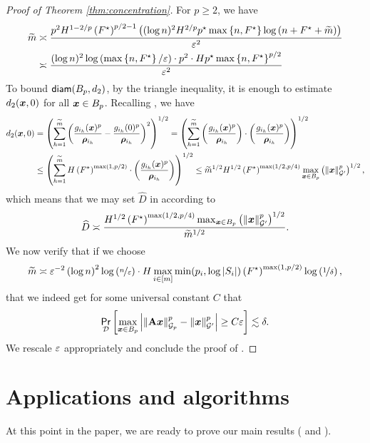\documentclass[11pt]{article}
\numberwithin{equation}{section}
\begin{document}
\begin{proof}[Proof of Theorem \ref{thm:concentration}]
For $p \ge 2$, we have
\begin{align*}
    \widetilde{m} &\asymp \frac{p^2H^{1-2/p}\left(F^{\star}\right)^{p/2-1}\left((\log n)^2H^{2/p}p^{\star}\max\left\{n,F^{\star}\right\}\log\left(n+F^{\star}+\widetilde{m}\right)\right)}{\varepsilon^2} \\
    &\asymp \frac{(\log n)^2\log\left(\max\left\{n,F^{\star}\right\}/\varepsilon\right)\cdot p^2 \cdot Hp^{\star}\max\left\{n,F^{\star}\right\}^{p/2}}{\varepsilon^2}
\end{align*}
To bound $\mathsf{diam}(B_p,d_2)$, by the triangle inequality, it is enough to estimate $d_2(\bm{x},0)$ for all $\bm{x} \in B_p$. Recalling , we have
\begin{align*}
    d_2(\bm{x},0) &= \left(\sum_{h=1}^{\widetilde{m}} \left(\frac{g_{i_h}(\bm{x})^p}{\bm{\rho}_{i_h}} - \frac{g_{i_h}(0)^p}{\bm{\rho}_{i_h}}\right)^2\right)^{1/2} = \left(\sum_{h=1}^{\widetilde{m}} \left(\frac{g_{i_h}(\bm{x})^p}{\bm{\rho}_{i_h}}\right)\cdot\left(\frac{g_{i_h}(\bm{x})^p}{\bm{\rho}_{i_h}}\right)\right)^{1/2} \\
    &\le \left(\sum_{h=1}^{\widetilde{m}} H\left(F^{\star}\right)^{\max(1,p/2)}\cdot\left(\frac{g_{i_h}(\bm{x})^p}{\bm{\rho}_{i_h}}\right)\right)^{1/2} \le \widetilde{m}^{1/2}H^{1/2}\left(F^{\star}\right)^{\max(1/2,p/4)}\max_{\bm{x}\in B_p}\left(\left\lVert \bm{x} \right\rVert_{\mathcal{G}'}^{p}\right)^{1/2},
\end{align*}
which means that we may set $\widehat{D}$ in  according to
\begin{align*}
    \widehat{D} \asymp \frac{H^{1/2}\left(F^{\star}\right)^{\max(1/2,p/4)}\max_{\bm{x}\in B_p}\left(\left\lVert \bm{x} \right\rVert_{\mathcal{G}'}^{p}\right)^{1/2}}{\widetilde{m}^{1/2}}.
\end{align*}
We now verify that if we choose
\begin{align*}
    \widetilde{m} \asymp \varepsilon^{-2}\left(\log n\right)^2\log\left(\nicefrac{n}{\varepsilon}\right) \cdot H\max_{i \in [m]} \min(p_i,\log\left\lvert S_i \right\rvert) \left(F^{\star}\right)^{\max(1,p/2)}\log\left(\nicefrac{1}{\delta}\right),
\end{align*}
that we indeed get for some universal constant $C$ that
\begin{align*}
    \underset{\mathcal{D}}{\mathsf{Pr}}\left[\max_{\bm{x}\in B_p} \left\lvert \left\lVert \mathbf{A}\bm{x} \right\rVert_{\mathcal{G}_{p}}^p-\left\lVert \bm{x} \right\rVert_{\mathcal{G}'}^p \right\rvert \ge C\varepsilon\right] \lesssim \delta.
\end{align*}
We rescale $\varepsilon$ appropriately and conclude the proof of .
\end{proof}

\section{Applications and algorithms}
\label{sec:applications}
At this point in the paper, we are ready to prove our main results ( and ).
\end{document}
